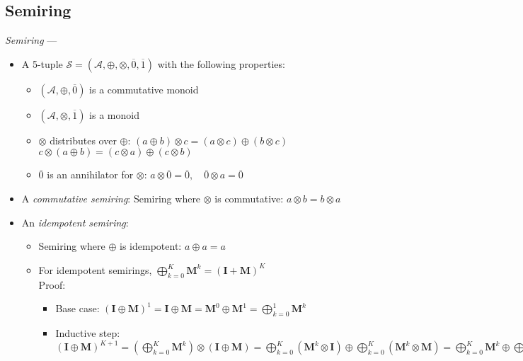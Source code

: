 \subsection*{Semiring}
\emph{Semiring} ---
\begin{itemize}
    \item A 5-tuple $\mathcal{S} = (\mathcal{A}, \oplus, \otimes, \overline{0}, \overline{1})$ with the following properties:
    \begin{itemize}
        \item $(\mathcal{A}, \oplus, \overline{0})$ is a commutative monoid
        \item $(\mathcal{A}, \otimes, \overline{1})$ is a monoid
        \item $\otimes$ distributes over $\oplus$:
        $
        (a \oplus b) \otimes c = (a \otimes c) \oplus (b \otimes c)
        $
        $
        c \otimes (a \oplus b) = (c \otimes a) \oplus (c \otimes b)
        $
        \item $\overline{0}$ is an annihilator for $\otimes$:
        $
        a \otimes \overline{0} = \overline{0}, \quad \overline{0} \otimes a = \overline{0}
        $
    \end{itemize}
    \item A \emph{commutative semiring}: Semiring where $\otimes$ is commutative: $a \otimes b = b \otimes a$
    \item An \emph{idempotent semiring}: 
    \begin{itemize}
        \item Semiring where $\oplus$ is idempotent: $a \oplus a = a$
        \item For idempotent semirings, $\bigoplus_{k=0}^{K} \boldsymbol{M}^k = ( \boldsymbol{I} + \boldsymbol{M})^{K}$\\
        Proof:
        \begin{itemize}
            \item Base case: $(\boldsymbol{I} \oplus \boldsymbol{M})^1 = \boldsymbol{I} \oplus \boldsymbol{M} = \boldsymbol{M}^0 \oplus \boldsymbol{M}^1 = \bigoplus_{k=0}^1 \boldsymbol{M}^k$
            \item Inductive step: $(\boldsymbol{I} \oplus \boldsymbol{M})^{K+1} = \left( \bigoplus_{k=0}^K \boldsymbol{M}^k \right) \otimes (\boldsymbol{I} \oplus \boldsymbol{M}) = \bigoplus_{k=0}^K (\boldsymbol{M}^k \otimes \boldsymbol{I}) \oplus \bigoplus_{k=0}^K (\boldsymbol{M}^k \otimes \boldsymbol{M}) = \bigoplus_{k=0}^K \boldsymbol{M}^k \oplus \bigoplus_{k=0}^K \boldsymbol{M}^{k+1} = \bigoplus_{k=0}^K \boldsymbol{M}^k \oplus \bigoplus_{k=1}^{K+1} \boldsymbol{M}^k$

\end{itemize}
\end{itemize}
\end{itemize}

